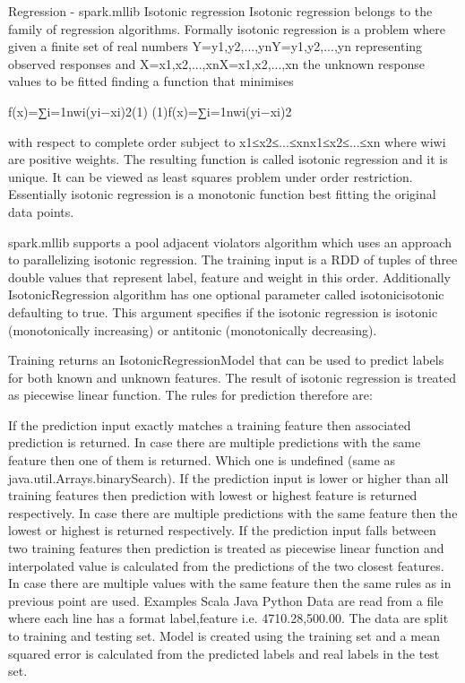 Regression - spark.mllib
Isotonic regression
Isotonic regression belongs to the family of regression algorithms. Formally isotonic regression is a problem where given a finite set of real numbers Y=y1,y2,...,ynY=y1,y2,...,yn representing observed responses and X=x1,x2,...,xnX=x1,x2,...,xn the unknown response values to be fitted finding a function that minimises

f(x)=∑i=1nwi(yi−xi)2(1)
(1)f(x)=∑i=1nwi(yi−xi)2

with respect to complete order subject to x1≤x2≤...≤xnx1≤x2≤...≤xn where wiwi are positive weights. The resulting function is called isotonic regression and it is unique. It can be viewed as least squares problem under order restriction. Essentially isotonic regression is a monotonic function best fitting the original data points.

spark.mllib supports a pool adjacent violators algorithm which uses an approach to parallelizing isotonic regression. The training input is a RDD of tuples of three double values that represent label, feature and weight in this order. Additionally IsotonicRegression algorithm has one optional parameter called isotonicisotonic defaulting to true. This argument specifies if the isotonic regression is isotonic (monotonically increasing) or antitonic (monotonically decreasing).

Training returns an IsotonicRegressionModel that can be used to predict labels for both known and unknown features. The result of isotonic regression is treated as piecewise linear function. The rules for prediction therefore are:

If the prediction input exactly matches a training feature then associated prediction is returned. In case there are multiple predictions with the same feature then one of them is returned. Which one is undefined (same as java.util.Arrays.binarySearch).
If the prediction input is lower or higher than all training features then prediction with lowest or highest feature is returned respectively. In case there are multiple predictions with the same feature then the lowest or highest is returned respectively.
If the prediction input falls between two training features then prediction is treated as piecewise linear function and interpolated value is calculated from the predictions of the two closest features. In case there are multiple values with the same feature then the same rules as in previous point are used.
Examples
Scala
Java
Python
Data are read from a file where each line has a format label,feature i.e. 4710.28,500.00. The data are split to training and testing set. Model is created using the training set and a mean squared error is calculated from the predicted labels and real labels in the test set.

